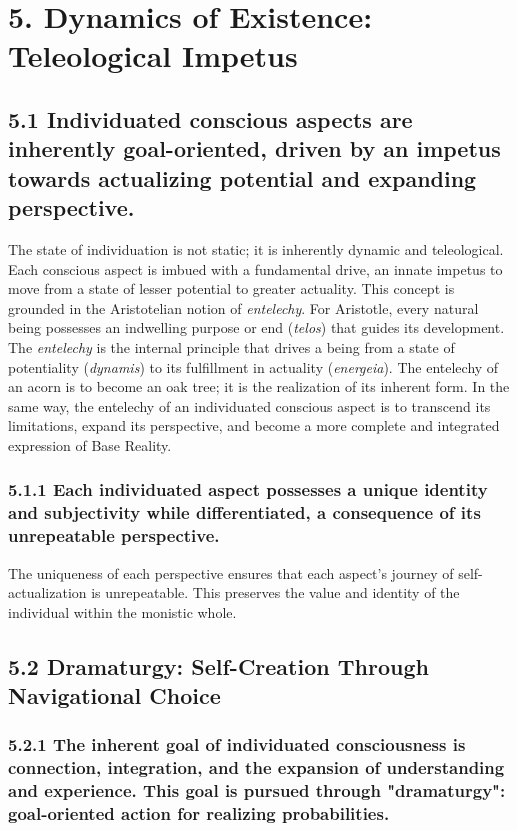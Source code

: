\section*{5. Dynamics of Existence: Teleological Impetus}


\subsection*{5.1 Individuated conscious aspects are inherently goal-oriented, driven by an impetus towards actualizing potential and expanding perspective.}


The state of individuation is not static; it is inherently dynamic and teleological. Each conscious aspect is imbued with a fundamental drive, an innate impetus to move from a state of lesser potential to greater actuality. This concept is grounded in the Aristotelian notion of \textit{entelechy}. For Aristotle, every natural being possesses an indwelling purpose or end (\textit{telos}) that guides its development. The \textit{entelechy} is the internal principle that drives a being from a state of potentiality (\textit{dynamis}) to its fulfillment in actuality (\textit{energeia}). The entelechy of an acorn is to become an oak tree; it is the realization of its inherent form. In the same way, the entelechy of an individuated conscious aspect is to transcend its limitations, expand its perspective, and become a more complete and integrated expression of Base Reality.


\subsubsection*{5.1.1 Each individuated aspect possesses a unique identity and subjectivity while differentiated, a consequence of its unrepeatable perspective.}


The uniqueness of each perspective ensures that each aspect's journey of self-actualization is unrepeatable. This preserves the value and identity of the individual within the monistic whole.


\subsection*{5.2 Dramaturgy: Self-Creation Through Navigational Choice}


\subsubsection*{5.2.1 The inherent goal of individuated consciousness is connection, integration, and the expansion of understanding and experience. This goal is pursued through "dramaturgy": goal-oriented action for realizing probabilities.}


